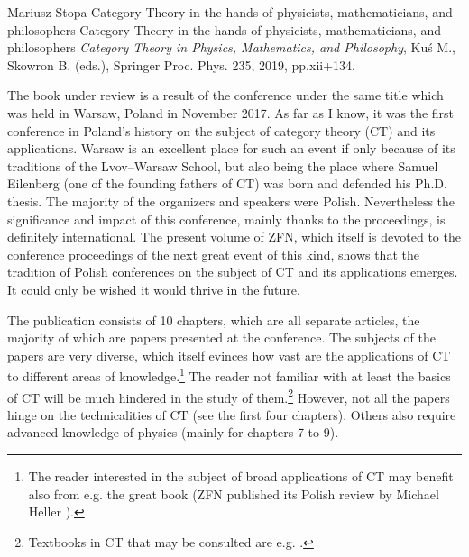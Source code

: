 \begin{recengenv}{Mariusz Stopa}
	{Category Theory in the hands of physicists, mathematicians, and philosophers}
	{Category Theory in the hands of physicists, mathematicians, and philosophers}
	{\textit{Category Theory in Physics, Mathematics, and Philosophy}, Kuś M., Skowron B. (eds.), Springer Proc. Phys. 235, 2019, pp.xii+134.}

The book under review is a result of the conference under the same title which was held in Warsaw, Poland in November 2017. As far as I know, it was the first conference in Poland's history on the subject of cat\-e\-go\-ry theory (CT) and its applications. Warsaw is an excellent place for such an event if only because of its traditions of the Lvov–Warsaw School, but also being the place where Samuel Eilenberg (one of the founding fathers of CT) was born and defended his Ph.D. thesis. The majority of the organizers and speakers were Polish. Nevertheless the significance and impact of this conference, mainly thanks to the proceedings, is definitely international. The present volume of ZFN, which itself is devoted to the conference proceedings of the next great event of this kind, shows that the tradition of Polish conferences on the subject of CT and its applications emerges. It could only be wished it would thrive in the future.

The publication consists of 10 chapters, which are all separate articles, the majority of which are papers presented at the conference. The subjects of the papers are very diverse, which itself evinces how vast are the applications of CT to different areas of knowledge.\footnote{The reader interested in the subject of broad applications of CT may benefit also from e.g. the great book \parencite{awodey_category_2010} (ZFN published its Polish review by Michael Heller \parencite*{heller_filozoficznie_2018}).} The reader not familiar with at least the basics of CT will be much hindered in the study of them.\footnote{Textbooks in CT that may be consulted are e.g. \parencite{awodey_category_2010, smith_category_2018, mclarty_elementary_1995}.} However, not all the papers hinge on the technicalities of CT (see the first four chapters). Others also require advanced knowledge of physics (mainly for chapters 7 to 9).


\end{recengenv}
